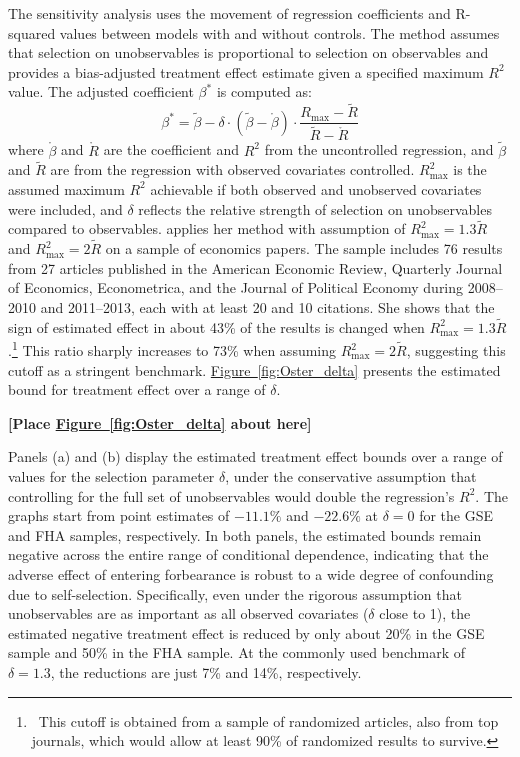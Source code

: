 \documentclass[11pt]{article}
\begin{document}
{ The sensitivity analysis uses the movement of regression coefficients and R-squared values between models with and without controls. The method assumes that selection on unobservables is proportional to selection on observables and provides a bias-adjusted treatment effect estimate given a specified maximum \( R^2 \) value. The adjusted coefficient \( \beta^* \) is computed as:
\[
\beta^* = \tilde{\beta} - \delta \cdot (\tilde{\beta} - \mathring{\beta}) \cdot \frac{R_{\max} - \tilde{R}}{\tilde{R} - \mathring{R}}
\]
where \( \mathring{\beta} \) and \( \mathring{R} \) are the coefficient and \( R^2 \) from the uncontrolled regression, and \( \tilde{\beta} \) and \( \tilde{R} \) are from the regression with observed covariates controlled. \( R^2_{\text{max}} \) is the assumed maximum \( R^2 \) achievable if both observed and unobserved covariates were included, and \( \delta \) reflects the relative strength of selection on unobservables compared to observables. \citet{oster2019} applies her method with assumption of \( R^2_{\text{max}} = 1.3\tilde{R} \) and \( R^2_{\text{max}} = 2\tilde{R} \) on a sample of economics papers. The sample includes 76 results from 27 articles published in the American Economic Review, Quarterly Journal of Economics, Econometrica, and the Journal of Political Economy during 2008–2010 and 2011–2013, each with at least 20 and 10 citations. She shows that the sign of estimated effect in about 43\% of the results is changed when \( R^2_{\text{max}} = 1.3\tilde{R} \).\footnote{~This cutoff is obtained from a sample of randomized articles, also from top journals, which would allow at least 90\% of randomized results to survive. } This ratio sharply increases to 73\% when assuming \( R^2_{\text{max}} = 2\tilde{R} \), suggesting this cutoff as a stringent benchmark.  \hyperref[fig:Oster_delta]{Figure~\ref*{fig:Oster_delta}} presents the estimated bound for treatment effect over a range of \( \delta \).  

\bigskip
\centerline{\bf [Place \hyperref[fig:Oster_delta]{Figure~\ref*{fig:Oster_delta}} about here]}
\bigskip

Panels (a) and (b) display the estimated treatment effect bounds over a range of values for the selection parameter \( \delta \), under the conservative assumption that controlling for the full set of unobservables would double the regression’s \(R^2\). The graphs start from point estimates of \(-11.1\%\) and \(-22.6\%\) at \( \delta = 0 \) for the GSE and FHA samples, respectively. In both panels, the estimated bounds remain negative across the entire range of conditional dependence, indicating that the adverse effect of entering forbearance is robust to a wide degree of confounding due to self-selection. Specifically, even under the rigorous assumption that unobservables are as important as all observed covariates (\(\delta\) close to 1), the estimated negative treatment effect is reduced by only about 20\% in the GSE sample and 50\% in the FHA sample. At the commonly used benchmark of \(\delta = 1.3\), the reductions are just 7\% and 14\%, respectively.

}
\end{document}
